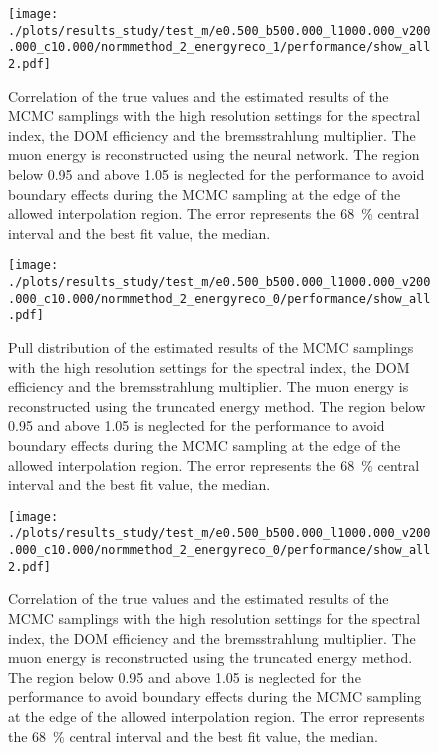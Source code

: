 \begin{figure}
    \centering
    \texttt{[image: ./plots/results\_study/test\_m/e0.500\_b500.000\_l1000.000\_v200.000\_c10.000/normmethod\_2\_energyreco\_1/performance/show\_all2.pdf]}
    \caption{Correlation of the true values and the estimated results of the MCMC samplings with the high resolution settings for the spectral index, the DOM efficiency and the bremsstrahlung multiplier. The muon energy is reconstructed using the neural network. The region below 0.95 and above 1.05 is neglected for the performance to avoid boundary effects during the MCMC sampling at the edge of the allowed interpolation region. The error represents the \SI{68}{\%} central interval and the best fit value, the median.}
    \label{fig:study_result_corr_high_nn}
\end{figure}

%

\begin{figure}
    \centering
    \texttt{[image: ./plots/results\_study/test\_m/e0.500\_b500.000\_l1000.000\_v200.000\_c10.000/normmethod\_2\_energyreco\_0/performance/show\_all.pdf]}
    \caption{Pull distribution of the estimated results of the MCMC samplings with the high resolution settings for the spectral index, the DOM efficiency and the bremsstrahlung multiplier. The muon energy is reconstructed using the truncated energy method. The region below 0.95 and above 1.05 is neglected for the performance to avoid boundary effects during the MCMC sampling at the edge of the allowed interpolation region. The error represents the \SI{68}{\%} central interval and the best fit value, the median.}
    \label{fig:study_result_pull_high_te}
\end{figure}

\begin{figure}
    \centering
    \texttt{[image: ./plots/results\_study/test\_m/e0.500\_b500.000\_l1000.000\_v200.000\_c10.000/normmethod\_2\_energyreco\_0/performance/show\_all2.pdf]}
    \caption{Correlation of the true values and the estimated results of the MCMC samplings with the high resolution settings for the spectral index, the DOM efficiency and the bremsstrahlung multiplier. The muon energy is reconstructed using the truncated energy method. The region below 0.95 and above 1.05 is neglected for the performance to avoid boundary effects during the MCMC sampling at the edge of the allowed interpolation region. The error represents the \SI{68}{\%} central interval and the best fit value, the median.}
    \label{fig:study_result_corr_high_te}
\end{figure}

